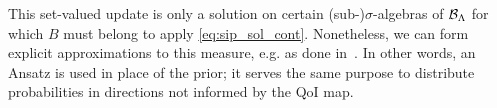 This set-valued update is only a solution on certain (sub-)$\sigma$-algebras of $\mathcal{B}_{{\Lambda}}$ for which $B$ must belong to apply \eqref{eq:sip_sol_cont}. 
Nonetheless, we can form explicit approximations to this measure, e.g. as done in~\cite{BET+14, BES12, BBE11}. 
In other words, an Ansatz is used in place of the prior; it serves the same purpose to distribute probabilities in directions not informed by the QoI map.


\vfill
